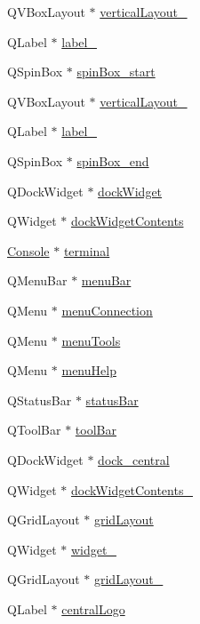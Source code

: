 \begin{DoxyCompactItemize}
Q\+V\+Box\+Layout $\ast$ \hyperlink{a00080_a38b8a4b887f3b58e2a49e7905ae6f1f0}{vertical\+Layout\+\_}
\item 
Q\+Label $\ast$ \hyperlink{a00080_a0376fd90247280e7c7957cc70628708c}{label\+\_}
\item 
Q\+Spin\+Box $\ast$ \hyperlink{a00080_acb4d6609c580645dac5aee1f1ad59d01}{spin\+Box\+\_\+start}
\item 
Q\+V\+Box\+Layout $\ast$ \hyperlink{a00080_a6f40fc110b15410c00837a446d57bdbe}{vertical\+Layout\+\_}
\item 
Q\+Label $\ast$ \hyperlink{a00080_a78c7e10730b43c6700cd7216911ed76a}{label\+\_}
\item 
Q\+Spin\+Box $\ast$ \hyperlink{a00080_a8ebeb5caa10878d7806d1f548913b449}{spin\+Box\+\_\+end}
\item 
Q\+Dock\+Widget $\ast$ \hyperlink{a00080_ac8a083c4b66fb317a9b538409ce412e2}{dock\+Widget}
\item 
Q\+Widget $\ast$ \hyperlink{a00080_a765ded8236736213d556f6f91941808e}{dock\+Widget\+Contents}
\item 
\hyperlink{a00005}{Console} $\ast$ \hyperlink{a00080_aae71c46ea4546df5994735dee573b2dd}{terminal}
\item 
Q\+Menu\+Bar $\ast$ \hyperlink{a00080_a2be1c24ec9adfca18e1dcc951931457f}{menu\+Bar}
\item 
Q\+Menu $\ast$ \hyperlink{a00080_a08372e1c0820afb98e2cdf98d1738036}{menu\+Connection}
\item 
Q\+Menu $\ast$ \hyperlink{a00080_a552c7b6d729252c2768c9a077679fef7}{menu\+Tools}
\item 
Q\+Menu $\ast$ \hyperlink{a00080_ab95dbfbb0550206aeac76db36f491548}{menu\+Help}
\item 
Q\+Status\+Bar $\ast$ \hyperlink{a00080_a50fa481337604bcc8bf68de18ab16ecd}{status\+Bar}
\item 
Q\+Tool\+Bar $\ast$ \hyperlink{a00080_ab84dc49349f514d7b7d3fe8e78de069b}{tool\+Bar}
\item 
Q\+Dock\+Widget $\ast$ \hyperlink{a00080_a19105d0d919fa33b5f29f7677bbab054}{dock\+\_\+central}
\item 
Q\+Widget $\ast$ \hyperlink{a00080_aee633ff4cf1f7b57d7490ac2abf023de}{dock\+Widget\+Contents\+\_}
\item 
Q\+Grid\+Layout $\ast$ \hyperlink{a00080_a525ed3c5fe0784ac502ee222fba4e205}{grid\+Layout}
\item 
Q\+Widget $\ast$ \hyperlink{a00080_a7e6140f8a0c9dd88512918a04bc46441}{widget\+\_}
\item 
Q\+Grid\+Layout $\ast$ \hyperlink{a00080_aa9ccdb529e4396a7c1d52c07add8e4ab}{grid\+Layout\+\_}
\item 
Q\+Label $\ast$ \hyperlink{a00080_ab5c037236f041a2a7753d3e4efd3d0e8}{central\+Logo}
\end{DoxyCompactItemize}


